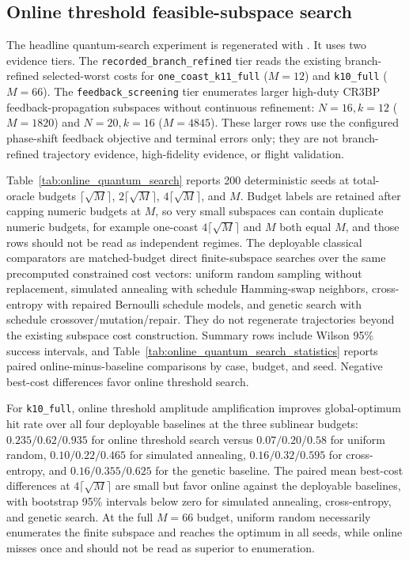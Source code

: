 \documentclass[preprint,12pt]{elsarticle}
\begin{document}
\subsection{Online threshold feasible-subspace search}

The headline quantum-search experiment is regenerated with . It uses two evidence tiers. The \texttt{recorded\_branch\_refined} tier reads the existing branch-refined selected-worst costs for \texttt{one\_coast\_k11\_full} ($M=12$) and \texttt{k10\_full} ($M=66$). The \texttt{feedback\_screening} tier enumerates larger high-duty CR3BP feedback-propagation subspaces without continuous refinement: $N=16,k=12$ ($M=1820$) and $N=20,k=16$ ($M=4845$). These larger rows use the configured phase-shift feedback objective and terminal errors only; they are not branch-refined trajectory evidence, high-fidelity evidence, or flight validation.

Table~\ref{tab:online_quantum_search} reports 200 deterministic seeds at total-oracle budgets $\lceil\sqrt{M}\rceil$, $2\lceil\sqrt{M}\rceil$, $4\lceil\sqrt{M}\rceil$, and $M$. Budget labels are retained after capping numeric budgets at $M$, so very small subspaces can contain duplicate numeric budgets, for example one-coast $4\lceil\sqrt{M}\rceil$ and $M$ both equal $M$, and those rows should not be read as independent regimes. The deployable classical comparators are matched-budget direct finite-subspace searches over the same precomputed constrained cost vectors: uniform random sampling without replacement, simulated annealing with schedule Hamming-swap neighbors, cross-entropy with repaired Bernoulli schedule models, and genetic search with schedule crossover/mutation/repair. They do not regenerate trajectories beyond the existing subspace cost construction. Summary rows include Wilson 95\% success intervals, and Table~\ref{tab:online_quantum_search_statistics} reports paired online-minus-baseline comparisons by case, budget, and seed. Negative best-cost differences favor online threshold search.

For \texttt{k10\_full}, online threshold amplitude amplification improves global-optimum hit rate over all four deployable baselines at the three sublinear budgets: $0.235/0.62/0.935$ for online threshold search versus $0.07/0.20/0.58$ for uniform random, $0.10/0.22/0.465$ for simulated annealing, $0.16/0.32/0.595$ for cross-entropy, and $0.16/0.355/0.625$ for the genetic baseline. The paired mean best-cost differences at $4\lceil\sqrt{M}\rceil$ are small but favor online against the deployable baselines, with bootstrap 95\% intervals below zero for simulated annealing, cross-entropy, and genetic search. At the full $M=66$ budget, uniform random necessarily enumerates the finite subspace and reaches the optimum in all seeds, while online misses once and should not be read as superior to enumeration.
\end{document}
